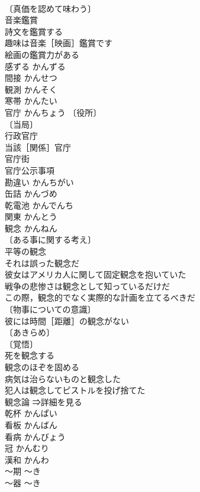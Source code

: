 \documentclass[8pt]{extreport}
\begin{document}
\begin{CJK}{UTF8}{min}
\\	〔真価を認めて味わう〕
\\	音楽鑑賞 
\\	詩文を鑑賞する 
\\	趣味は音楽［映画］鑑賞です 
\\	絵画の鑑賞力がある 
\\	感ずる	かんずる	
\\	間接	かんせつ	
\\	観測	かんそく	
\\	寒帯	かんたい	
\\	官庁	かんちょう	〔役所〕
\\	〔当局〕
\\	行政官庁 
\\	当該［関係］官庁 
\\	官庁街 
\\	官庁公示事項 
\\	勘違い	かんちがい	
\\	缶詰	かんづめ	
\\	乾電池	かんでんち	
\\	関東	かんとう	
\\	観念	かんねん	
\\	〔ある事に関する考え〕
\\	平等の観念 
\\	それは誤った観念だ 
\\	彼女はアメリカ人に関して固定観念を抱いていた 
\\	戦争の悲惨さは観念として知っているだけだ 
\\	この際，観念的でなく実際的な計画を立てるべきだ 
\\	〔物事についての意識〕
\\	彼には時間［距離］の観念がない 
\\	〔あきらめ〕
\\	〔覚悟〕
\\	死を観念する 
\\	観念のほぞを固める 
\\	病気は治らないものと観念した 
\\	犯人は観念してピストルを投げ捨てた 
\\	観念論 ⇒詳細を見る
\\	乾杯	かんぱい	
\\	看板	かんばん	
\\	看病	かんびょう	
\\	冠	かんむり	
\\	漢和	かんわ	
\\	～期	～き	
\\	～器	～き	

\end{CJK}
\end{document}
